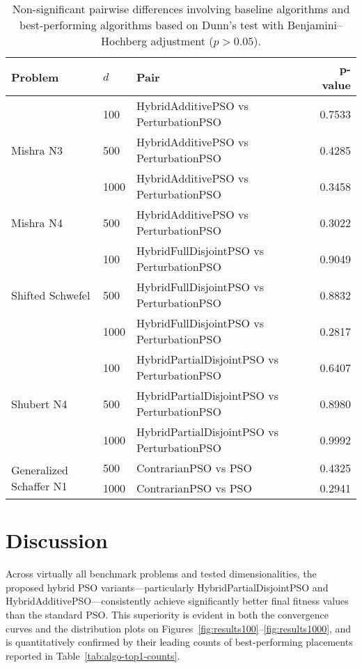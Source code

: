 {\begin{longtable}{llp{}r}
\caption[Non-significant pairwise differences from Dunn's test]{Non-significant pairwise differences involving baseline algorithms and best-performing algorithms based on Dunn’s test with Benjamini–Hochberg adjustment ($p > 0.05$).}
\label{tab:dunnfail}
\\
\toprule
\textbf{Problem} & \textbf{$d$} & \textbf{Pair} & \textbf{p-value} \\
\midrule
\multirow{3}{*}{Mishra N3}
    & 100  & HybridAdditivePSO vs PerturbationPSO        & 0.7533 \\
    & 500  & HybridAdditivePSO vs PerturbationPSO        & 0.4285 \\
    & 1000 & HybridAdditivePSO vs PerturbationPSO        & 0.3458 \\
\midrule
\multirow{1}{*}{Mishra N4}
    & 500  & HybridAdditivePSO vs PerturbationPSO        & 0.3022 \\
\midrule
\multirow{3}{*}{Shifted Schwefel}
    & 100  & HybridFullDisjointPSO vs PerturbationPSO    & 0.9049 \\
    & 500  & HybridFullDisjointPSO vs PerturbationPSO    & 0.8832 \\
    & 1000 & HybridFullDisjointPSO vs PerturbationPSO    & 0.2817 \\
\midrule
\multirow{3}{*}{Shubert N4}
    & 100  & HybridPartialDisjointPSO vs PerturbationPSO & 0.6407 \\
    & 500  & HybridPartialDisjointPSO vs PerturbationPSO & 0.8980 \\
    & 1000 & HybridPartialDisjointPSO vs PerturbationPSO & 0.9992 \\
\midrule
\multirow{2}{*}{Generalized Schaffer N1}
    & 500  & ContrarianPSO vs PSO                        & 0.4325 \\
    & 1000 & ContrarianPSO vs PSO                        & 0.2941 \\
\bottomrule
\end{longtable}










\section{Discussion}

Across virtually all benchmark problems and tested dimensionalities, the proposed hybrid PSO variants---particularly HybridPartialDisjointPSO and HybridAdditivePSO---consistently achieve significantly better final fitness values than the standard PSO. This superiority is evident in both the convergence curves and the distribution plots on Figures~\ref{fig:results100}–\ref{fig:results1000}, and is quantitatively confirmed by their leading counts of best-performing placements reported in Table~\ref{tab:algo-top1-counts}.

}
